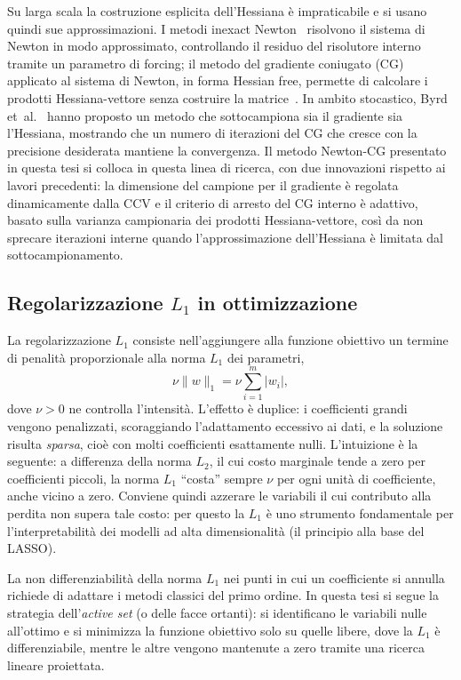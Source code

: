 \documentclass[a4paper,12pt]{article}
\numberwithin{equation}{section}
\numberwithin{figure}{section}
\numberwithin{table}{section}
\begin{document}
Su larga scala la costruzione esplicita dell'Hessiana è impraticabile e si
usano quindi sue approssimazioni. I metodi
inexact Newton~\cite{dembo1982} risolvono il sistema di Newton in modo
approssimato, controllando il residuo del risolutore interno tramite un
parametro di forcing; il metodo del gradiente coniugato (CG) applicato al
sistema di Newton, in forma Hessian free, permette di calcolare i
prodotti Hessiana-vettore senza costruire la matrice~\cite{shewchuk1994,
nocedal2006}. In ambito stocastico, Byrd et~al.~\cite{byrd2011} hanno proposto
un metodo che sottocampiona sia il gradiente sia l'Hessiana, mostrando che un
numero di iterazioni del CG che cresce con la precisione desiderata mantiene la
convergenza. Il metodo Newton-CG presentato in questa tesi si colloca in questa
linea di ricerca, con due innovazioni rispetto ai lavori precedenti: la
dimensione del campione per il gradiente è regolata dinamicamente dalla CCV e
il criterio di arresto del CG interno è adattivo, basato sulla varianza
campionaria dei prodotti Hessiana-vettore, così da non sprecare iterazioni
interne quando l'approssimazione dell'Hessiana è limitata dal sottocampionamento.

\subsection{Regolarizzazione $L_1$ in ottimizzazione}

La regolarizzazione $L_1$ consiste nell'aggiungere alla funzione obiettivo un
termine di penalità proporzionale alla norma $L_1$ dei parametri,
{\setlength{\abovedisplayskip}{4pt}\setlength{\belowdisplayskip}{4pt}%
\setlength{\abovedisplayshortskip}{2pt}\setlength{\belowdisplayshortskip}{2pt}%
\[
\nu\|w\|_1 = \nu \sum_{i=1}^{m} |w_i|,
\]}
dove $\nu > 0$ ne controlla l'intensità. L'effetto è
duplice: i coefficienti grandi vengono penalizzati, scoraggiando
l'adattamento eccessivo ai dati, e la soluzione risulta \emph{sparsa}, cioè con
molti coefficienti esattamente nulli. L'intuizione è la seguente: a differenza
della norma $L_2$, il cui costo marginale tende a zero per coefficienti piccoli,
la norma $L_1$ ``costa'' sempre $\nu$ per ogni unità di coefficiente, anche
vicino a zero. Conviene quindi azzerare le variabili il cui contributo alla
perdita non supera tale costo: per questo la $L_1$ è uno strumento fondamentale
per l'interpretabilità dei modelli ad alta dimensionalità (il principio alla
base del LASSO).

La non differenziabilità della norma $L_1$ nei punti in cui un coefficiente si
annulla richiede di adattare i metodi classici del primo ordine. In questa
tesi si segue la strategia dell'\emph{active set} (o delle facce ortanti): si
identificano le variabili nulle all'ottimo e si minimizza la funzione obiettivo
solo su quelle libere, dove la $L_1$ è differenziabile, mentre le altre vengono
mantenute a zero tramite una ricerca lineare proiettata.
\end{document}
